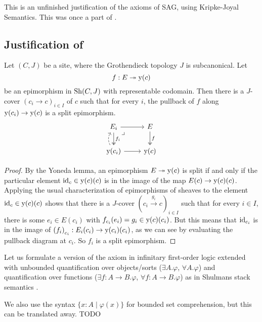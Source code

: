 This is an unfinished justification of the axioms of SAG,
using Kripke-Joyal Semantics. This was once a part of \cite{draft}.

\subsection{Justification of }

\begin{lemma}
  Let $(C, J)$ be a site,
  where the Grothendieck topology $J$ is subcanonical.
  Let
  \[ f : E \twoheadrightarrow \mathrm{y}(c) \]
  be an epimorphism in $\mathrm{Sh}(C, J)$ with representable codomain.
  Then there is a $J$-cover $(c_i \to c)_{i \in I}$ of $c$
  such that for every $i$,
  the pullback of $f$ along $\mathrm{y}(c_i) \to \mathrm{y}(c)$
  is a split epimorphism.
  \[ \begin{tikzcd}
    E_i \ar[r] \ar[d, two heads, "f_i"] \ar[dr, phantom, very near start, "\lrcorner"] &
    E \ar[d, two heads, "f"] \\
    \yo(c_i) \ar[r] \ar[u, bend left, dashed]&
    \yo(c)
  \end{tikzcd} \]
\end{lemma}

\begin{proof}
  By the Yoneda lemma,
  an epimorphism $E \twoheadrightarrow \mathrm{y}(c)$ is split
  if and only if
  the particular element $\mathrm{id}_c \in \mathrm{y}(c)(c)$
  is in the image of the map $E(c) \to \mathrm{y}(c)(c)$.
  Applying the usual characterization of epimorphisms of sheaves
  \cite[Corollary III.7.5]{maclane-moerdijk}
  to the element $\mathrm{id}_c \in \mathrm{y}(c)(c)$
  shows that there is a $J$-cover ${(c_i \xrightarrow{g_i} c)}_{i \in I}$
  such that for every $i \in I$,
  there is some $e_i \in E(c_i)$
  with $f_{c_i}(e_i) = g_i \in \mathrm{y}(c)(c_i)$.
  But this means that $\mathrm{id}_{c_i}$ is in the image of ${(f_i)}_{c_i} : E_i(c_i) \to \mathrm{y}(c_i)(c_i)$,
  as we can see by evaluating the pullback diagram at $c_i$.
  So $f_i$ is a split epimorphism.
\end{proof}

Let us formulate a version of the axiom 
in infinitary first-order logic extended with
unbounded quantification over objects/sorts
($\exists A. \varphi$, $\forall A. \varphi$)
and quantification over functions
($\exists f : A \to B. \varphi$, $\forall f : A \to B. \varphi$)
as in Shulmans stack semantics \cite[Section 7]{shulman-stack-semantics}.

We also use the syntax $\{x : A \mid \varphi(x)\}$
for bounded set comprehension,
but this can be translated away.
TODO

